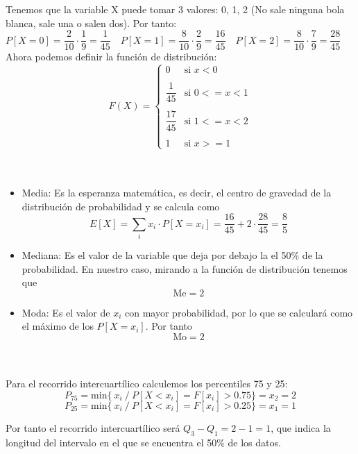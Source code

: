 \problem \\
\subproblem \\
Tenemos que la variable X puede tomar 3 valores: 0, 1, 2 (No sale ninguna bola blanca, sale una o salen dos). Por tanto: \\

$P[X = 0] = \dfrac{2}{10}\cdot\dfrac{1}{9} = \dfrac{1}{45} \quad
P[X = 1] = \dfrac{8}{10}\cdot\dfrac{2}{9} = \dfrac{16}{45} \quad 
P[X = 2] = \dfrac{8}{10}\cdot\dfrac{7}{9} = \dfrac{28}{45}$ \\

Ahora podemos definir la función de distribución: \\

$$
F(X) = \left\{
     \begin{array}{lr}
       0 & \mbox{si }  x < 0 \\
       \\
       \dfrac{1}{45} & \mbox{si }0 <= x < 1 \\
       \\
       \dfrac{17}{45}& \mbox{si }  1 <= x < 2 \\
       \\
       1 & \mbox{si } x >= 1 
     \end{array}
   \right.
$$
\\

\subproblem \\
\begin{itemize}
\item Media: Es la esperanza matemática, es decir, el centro de gravedad de la distribución de probabilidad y se calcula como $$E[X] = \sum_i x_i \cdot P[X = x_i] = \dfrac{16}{45} + 2\cdot \dfrac{28}{45} = \dfrac{8}{5}$$

\item Mediana: Es el valor de la variable que deja por debajo la el 50\% de la probabilidad. En nuestro caso, mirando a la función de distribución tenemos que $$ \mbox{Me} = 2 $$

\item Moda: Es el valor de $x_i$ con mayor probabilidad, por lo que se calculará como el máximo de los $P[X = x_i]$. Por tanto $$ \mbox{Mo} = 2$$
\end{itemize} \\

\subproblem \\
Para el recorrido intercuartílico calculemos los percentiles 75 y 25: \\

$$ P_{75} = \mbox{min}\{\ x_i\ /\ P[X < x_i] = F[x_i] > 0.75\} = x_2 = 2 $$
$$ P_{25} = \mbox{min}\{\ x_i\ /\ P[X < x_i] = F[x_i] > 0.25\} = x_1 = 1 $$

Por tanto el recorrido intercuartílico será $Q_3 - Q_1 = 2-1 = 1$, que indica la longitud del intervalo en el que se encuentra el 50\% de los datos.
